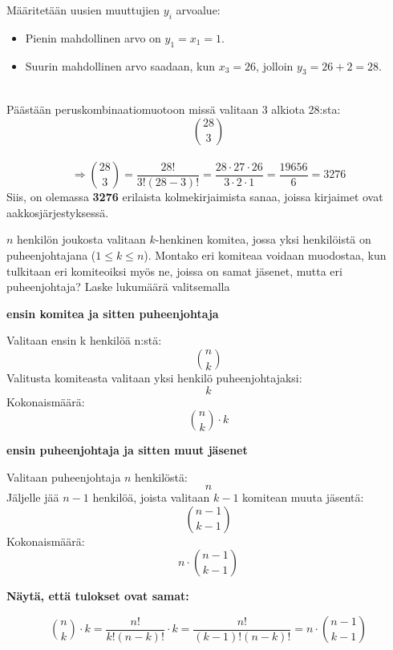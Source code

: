 \documentclass[12pt,a4paper]{article}
\begin{document}
Määritetään uusien muuttujien $y_i$ arvoalue:
\begin{itemize}
    \item Pienin mahdollinen arvo on $y_1 = x_1 = 1$.
    \item Suurin mahdollinen arvo saadaan, kun $x_3=26$, jolloin $y_3 = 26 + 2 = 28$.
\end{itemize}
\vspace{0.4cm}

\\

Päästään peruskombinaatiomuotoon missä valitaan 3 alkiota 28:sta:
\[
\binom{28}{3}
\]
\\
\[
\Rightarrow \binom{28}{3} = \frac{28!}{3!(28-3)!} = \frac{28 \cdot 27 \cdot 26}{3 \cdot 2 \cdot 1} = \frac{19656}{6} = 3276
\]
\vspace{0.5cm}
Siis, on olemassa \textbf{3276} erilaista kolmekirjaimista sanaa, joissa kirjaimet ovat aakkosjärjestyksessä.









\newpage
{}

$n$ henkilön joukosta valitaan $k$-henkinen komitea,
jossa yksi henkilöistä on puheenjohtajana ($1\leq k\leq n$). 
Montako eri komiteaa voidaan
muodostaa, kun tulkitaan eri komiteoiksi myös ne, joissa on samat
jäsenet, mutta eri puheenjohtaja? Laske lukumäärä valitsemalla \\


\begin{kohta}
  \item \textbf{ensin komitea ja sitten puheenjohtaja}

  Valitaan ensin k henkilöä n:stä:
  \[
  \binom{n}{k}
  \]
  Valitusta komiteasta valitaan yksi henkilö puheenjohtajaksi:
  \[
  k
  \]
  Kokonaismäärä:
  \[
  \binom{n}{k} \cdot k
  \]

  \item \textbf{ensin puheenjohtaja ja sitten muut jäsenet}

  Valitaan puheenjohtaja $n$ henkilöstä:
  \[
  n
  \]
  Jäljelle jää $n - 1$ henkilöä, joista valitaan $k - 1$ komitean muuta jäsentä:
  \[
  \binom{n-1}{k-1}
  \]
  Kokonaismäärä:
  \[
  n \cdot \binom{n-1}{k-1}
  \]
\end{kohta}

\textbf{Näytä, että tulokset ovat samat:}

\[
\binom{n}{k} \cdot k = \frac{n!}{k!(n-k)!} \cdot k = \frac{n!}{(k-1)!(n-k)!} = n \cdot \binom{n-1}{k-1}
\]



\end{document}

